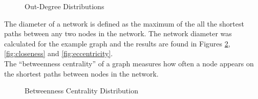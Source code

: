 \begin{figure}[h!]
\centering
{}
\caption{Out-Degree Distributions}
\label{fig:outdegree}
\end{figure}

\clearpage
 
The diameter of a network is defined as the maximum of the all the shortest paths between any two nodes in the network. The network diameter was calculated for the example graph and the results are found in Figures \ref{fig:between}, \ref{fig:closeness} and \ref{fig:eccentricity}.\\

The ``betweenness centrality'' of a graph measures how often a node appears on the shortest paths between nodes in the network.

\begin{figure}[h!]
\centering
{}
\caption{Betweenness Centrality Distribution}
\label{fig:between}
\end{figure}

